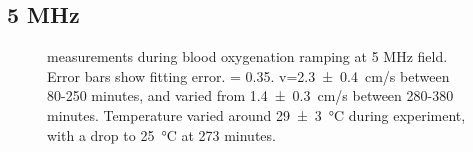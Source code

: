 \subsection{5 MHz}
\begin{figure}[h!tp]
\centering
{}



\caption[\Ttwo measurements during blood oxygenation ramping at 5 MHz field]{\Ttwo measurements during blood oxygenation ramping at 5 MHz field. Error bars show \Ttwo fitting error. \Hct = 0.35. v=\SI{2.3 \pm 0.4}{cm/s} between 80-250 minutes, and varied from \SI{1.4 \pm 0.3}{cm/s} between 280-380 minutes. Temperature varied around \SI{29 \pm 3}{\celsius} during experiment, with a drop to \SI{25}{\celsius} at 273 minutes.}
\label{fig:contflow-5mhzT2Time}
\end{figure}

